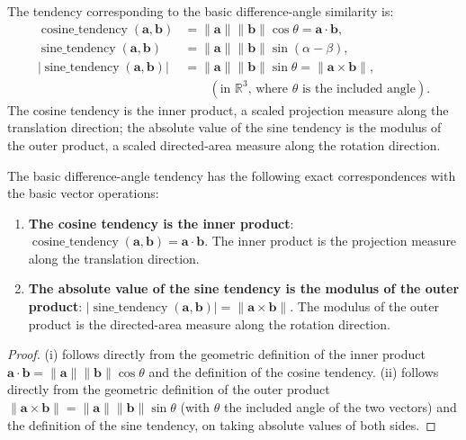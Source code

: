 \begin{definition}\label{def:basic_diff_tendency}
The tendency corresponding to the basic difference-angle similarity is:
\begin{align*}
\operatorname{cosine\_tendency}(\mathbf{a}, \mathbf{b}) &= \|\mathbf{a}\| \|\mathbf{b}\| \cos\theta = \mathbf{a} \cdot \mathbf{b}, \\
\operatorname{sine\_tendency}(\mathbf{a}, \mathbf{b}) &= \|\mathbf{a}\| \|\mathbf{b}\| \sin(\alpha-\beta), \\
\lvert\operatorname{sine\_tendency}(\mathbf{a}, \mathbf{b})\rvert &= \|\mathbf{a}\| \|\mathbf{b}\| \sin\theta = \|\mathbf{a} \times \mathbf{b}\|,\\&\qquad (\text{in } \mathbb{R}^3 \text{, where } \theta \text{ is the included angle}).
\end{align*}
The cosine tendency is the inner product, a scaled projection measure along the translation direction; the absolute value of the sine tendency is the modulus of the outer product, a scaled directed-area measure along the rotation direction.
\end{definition}

\begin{proposition}\label{prop:diff_tendency_relations}
The basic difference-angle tendency has the following exact correspondences with the basic vector operations:
\begin{enumerate}[label=(\roman*)]
    \item \textbf{The cosine tendency is the inner product}: $\operatorname{cosine\_tendency}(\mathbf{a}, \mathbf{b}) = \mathbf{a} \cdot \mathbf{b}$. The inner product is the projection measure along the translation direction.
    \item \textbf{The absolute value of the sine tendency is the modulus of the outer product}: $\lvert\operatorname{sine\_tendency}(\mathbf{a}, \mathbf{b})\rvert = \|\mathbf{a} \times \mathbf{b}\|$. The modulus of the outer product is the directed-area measure along the rotation direction.
\end{enumerate}
\end{proposition}

\begin{proof}
(i) follows directly from the geometric definition of the inner product $\mathbf{a} \cdot \mathbf{b} = \|\mathbf{a}\| \|\mathbf{b}\| \cos\theta$ and the definition of the cosine tendency. (ii) follows directly from the geometric definition of the outer product $\|\mathbf{a} \times \mathbf{b}\| = \|\mathbf{a}\| \|\mathbf{b}\| \sin\theta$ (with $\theta$ the included angle of the two vectors) and the definition of the sine tendency, on taking absolute values of both sides.
\end{proof}

